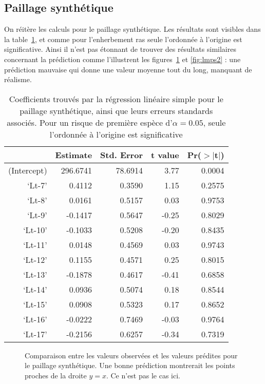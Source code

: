 \documentclass[a4paper, 11pt]{article}
\begin{document}
\subsection{Paillage synthétique}

On réitère les calculs pour le paillage synthétique. Les résultats sont visibles dans la table~\ref{tab:lmps}, et comme pour l'enherbement ras seule l'ordonnée à l'origine est significative. Ainsi il n'est pas étonnant de trouver des résultats similaires concernant la prédiction comme l'illustrent les figures~\ref{fig:lmps1} et \ref{fig:lmps2} : une prédiction mauvaise qui donne une valeur moyenne tout du long, manquant de réalisme.

\begin{table}[ht]
\centering
\caption{Coefficients trouvés par la régression linéaire simple pour le paillage synthétique, ainsi que leurs erreurs standards associés. Pour un risque de première espèce d'$\alpha = 0.05$, seule l'ordonnée à l'origine est significative}
\label{tab:lmps}
\begin{tabular}{rrrrr}
  
 & Estimate & Std. Error & t value & Pr($>$$|$t$|$) \\ 
  \hline
(Intercept) & 296.6741 & 78.6914 & 3.77 & 0.0004 \\ 
  `Lt-7' & 0.4112 & 0.3590 & 1.15 & 0.2575 \\ 
  `Lt-8' & 0.0161 & 0.5157 & 0.03 & 0.9753 \\ 
  `Lt-9' & -0.1417 & 0.5647 & -0.25 & 0.8029 \\ 
  `Lt-10' & -0.1033 & 0.5208 & -0.20 & 0.8435 \\ 
  `Lt-11' & 0.0148 & 0.4569 & 0.03 & 0.9743 \\ 
  `Lt-12' & 0.1155 & 0.4571 & 0.25 & 0.8015 \\ 
  `Lt-13' & -0.1878 & 0.4617 & -0.41 & 0.6858 \\ 
  `Lt-14' & 0.0936 & 0.5074 & 0.18 & 0.8544 \\ 
  `Lt-15' & 0.0908 & 0.5323 & 0.17 & 0.8652 \\ 
  `Lt-16' & -0.0222 & 0.7469 & -0.03 & 0.9764 \\ 
  `Lt-17' & -0.2156 & 0.6257 & -0.34 & 0.7319 
\end{tabular}
\end{table}

\begin{figure}[ht]
 \centering
 \caption{Comparaison entre les valeurs observées et les valeurs prédites pour le paillage synthétique. Une bonne prédiction montrerait les points proches de la droite $y=x$. Ce n'est pas le cas ici.}
 \label{fig:lmps1}
\end{figure}
\end{document}
